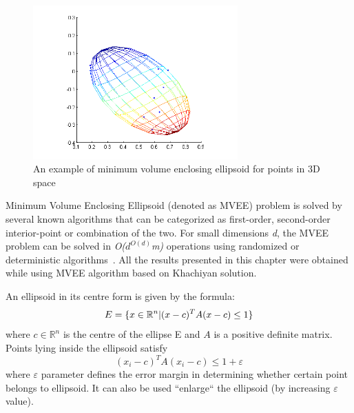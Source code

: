 \begin{figure}[htp]
	\centering
	\includegraphics[width=0.70\textwidth]{Figures/minimum_bounding_ellipsoid.png}
	\caption{An example of minimum volume enclosing ellipsoid for points in 3D space}
	\label{fig:minimum_bounding_ellipsoid_visualization}\vspace{-3pt}
\end{figure}

Minimum Volume Enclosing Ellipsoid (denoted as MVEE) problem is solved by several known algorithms that can be categorized as first-order, second-order interior-point or combination of the two. For small dimensions \textit{d}, the MVEE problem can be solved in \textit{O($d^{O(d)}$m)} operations using randomized or deterministic algorithms~\cite{MVEEMichaelTodd2005}. All the results presented in this chapter were obtained while using MVEE algorithm based on Khachiyan solution.

An ellipsoid in its centre form is given by the formula:
\vspace{-6pt} 
\[ 
\vspace{-3pt}
E = \{x \in \mathbb{R}^{n} | (x - c)^{T}A(x-c) \le 1\} 
\vspace{-3pt}
\] 
where $c \in \mathbb{R}^{n}$ is the centre of the ellipse E and $ A $ is a positive definite matrix. Points lying inside the ellipsoid satisfy 
\begin{equation}\label{eq:ellipsoid_affiliation}(x_{i} - c)^{T}A(x_{i} - c) \le 1 + \varepsilon\end{equation}
where $\varepsilon$ parameter defines the error margin in determining whether certain point belongs to ellipsoid. It can also be used ``enlarge`` the ellipsoid (by increasing $\varepsilon$ value).%

